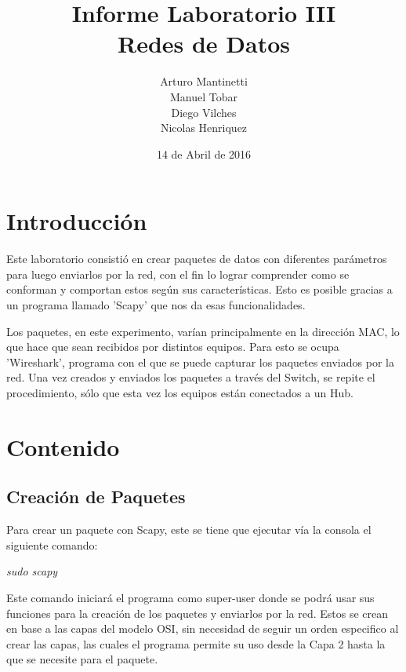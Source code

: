 \documentclass[spanish]{udpreport}
\title{Informe Laboratorio III \\ Redes de Datos}
\author{Arturo Mantinetti \\ Manuel Tobar \\ Diego Vilches \\ Nicolas Henriquez}
\date{14 de Abril de 2016}
\begin{document}
\maketitle

\tableofcontents

\chapter{Introducción}

Este laboratorio consistió en crear paquetes de datos con diferentes parámetros para luego enviarlos por la red, con el fin lo lograr comprender como se conforman y comportan estos según sus características. Esto es posible gracias a un programa llamado 'Scapy' que nos da esas funcionalidades. 

Los paquetes, en este experimento, varían principalmente en la dirección MAC, lo que hace que sean recibidos por distintos equipos. Para esto se ocupa 'Wireshark', programa con el que se puede capturar los paquetes enviados por la red.  Una vez creados y enviados los paquetes a través del Switch, se repite el procedimiento, sólo que esta vez los equipos están conectados a un Hub. 



\chapter{Contenido}

\section{Creación de Paquetes}
Para crear un paquete con Scapy, este se tiene que ejecutar vía la consola el siguiente comando:

\begin{center}
	\emph{sudo scapy}
\end{center}

Este comando iniciará el programa como super-user donde se podrá usar sus funciones para la creación de los paquetes y enviarlos por la red. Estos se crean en base a las capas del modelo OSI, sin necesidad de seguir un orden especifico al crear las capas, las cuales el programa permite su uso desde la Capa 2 hasta la que se necesite para el paquete.
\end{document}
